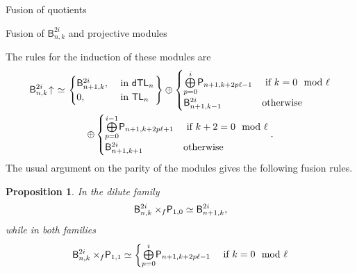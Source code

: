 \documentclass[reqno]{amsart}
\newtheorem{Prop}[Thm]{Proposition}
\newcommand{\dtl}[1]{\mathsf{dTL}_{#1}}
\newcommand{\tl}[1]{\mathsf{TL}_{#1}}
\newcommand{\dl}[1]{\mathsf I_{#1}}
\newcommand{\dP}[1]{\mathsf P_{#1}}
\newcommand{\xf}{\times\hspace{-0.27em}_f}
\newcommand{\T}[2]{\mathsf{T}^{#1}_{#2}}
\newcommand{\B}[2]{\mathsf{B}^{#1}_{#2}}
\newcommand{\lc}{\ell}
\newcommand{\Ind}[1]{#1{}\hspace{-0.18em} \uparrow{}\hskip -0.18em}
\begin{document}
\begin{section}{Fusion of quotients}
\begin{subsection}{Fusion of $\B{2i}{n,k}$ and projective modules}
\begin{figure}[b]
\end{figure}
The rules for the induction of these modules are \cite{BelRiSy}
\begin{multline}
	\Ind{\B{2i}{n,k}} \simeq  \left. \begin{cases}
	\B{2i}{n+1,k}, & \text{ in } \dtl{n}\\
	0, & \text{ in } \tl{n}
	\end{cases}\right\} \oplus \begin{cases}
	\overset{i}{\underset{p = 0}{\bigoplus}}\dP{n+1,k+2p\lc -1} & \text{ if } k = 0 \mod \lc \\
	 \B{2i}{n+1,k-1} & \text{otherwise}
	 \end{cases}\\
	 \oplus \begin{cases}
	 \overset{i-1}{\underset{p = 0}{\bigoplus}}\dP{n+1,k+2p\lc +1} & \text{ if } k+2 = 0 \mod \lc\\
	 \B{2i}{n+1,k+1} & \text{otherwise}
	 \end{cases}.
\end{multline}
The usual argument on the parity of the modules gives the following fusion rules.
\begin{Prop}\label{prop:fusionBvs01}
In the dilute family
\begin{equation}
\B{2i}{n,k} \xf \dP{1,0} \simeq \B{2i}{n+1,k},
\end{equation}
while in both families
\begin{multline}
\B{2i}{n,k} \xf \dP{1,1} \simeq \begin{cases}
	\overset{i}{\underset{p = 0}{\bigoplus}}\dP{n+1,k+2p\lc -1} & \text{ if } k = 0 \mod \lc \\

\end{cases}
\end{multline}
\end{Prop}
\end{subsection}
\end{section}
\end{document}
